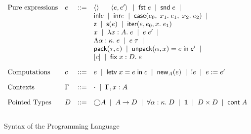 \begin{figure}
\begin{displaymath}
  \begin{array}{llcl}
    \mbox{Pure expressions} & 
     e & ::= & 
         \left<\right> \;\;|\;\;
         \left<{e},{e'}\right> \;\;|\;\;
         \mathsf{fst}\; e \;\;|\;\;
         \mathsf{snd}\; e \;\;|\;\; 
\\
     &&& \mathsf{inl }e \;\;|\;\;
         \mathsf{inr }e \;\;|\;\;
         \mathsf{case}(e_0,\; {x_1}.\; e_1,\; {x_2}.\; e_2) \;\;|\;\;
\\
     &&& \mathsf{z} \;\;|\;\; 
         \mathsf{s}(e) \;\;|\;\; 
         \mathsf{iter}(e, {e_0}, {x}.\; {e_1})
\\ 
     &&& x \;\;|\;\; \lambda x:A.\;e \;\;|\;\; e\;e' \;\;|\;\;
\\ 
     &&& \Lambda \alpha:\kappa.\;e \;\;|\;\; e\;\tau \;\;|\;\;
\\ 
     &&& \mathsf{pack}({\tau}, {e}) \;\;|\;\; \mathsf{unpack}({\alpha}, {x}) = {e} \;\mathsf{in}\;{e'} \;\;|\;\;
\\
     &&& [c] \;\;|\;\; \mathsf{fix}\;{x:D}.\;{e}
\\[1em]
  \mbox{Computations} & 
    c & ::= & e \;\;|\;\; \mathsf{letv}\;x = e\;\mathsf{in}\;c \;\;|\;\;
              \mathsf{new}_{A}(e) \;\;|\;\; !e \;\;|\;\; e := e'
\\[1em]
  \mbox{Contexts} & 
    \Gamma & ::= & \cdot \;\;|\;\; \Gamma, x:A 
\\[1em]
  \mbox{Pointed Types} & 
     D & ::= & \bigcirc{A} \;\;|\;\; A \to D \;\;|\;\; \forall \alpha:\kappa.\; D 
               \;\;|\;\; \mathbf{1} \;\;|\;\; D \times D \;\;|\;\; \mathsf{cont}\;{A} 
\\[1em] 
  \end{array}
\end{displaymath}
\caption{Syntax of the Programming Language}
\label{lang-syntax}
\end{figure}


